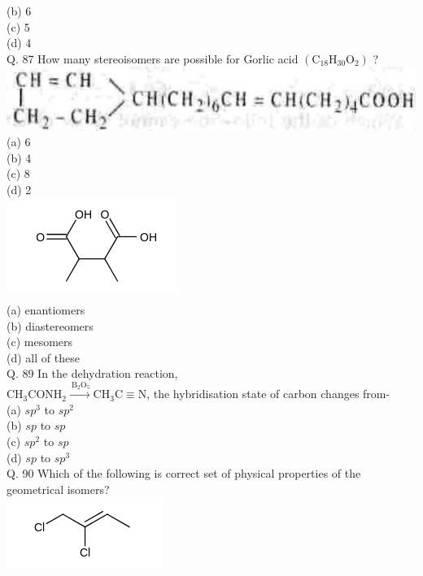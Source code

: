 \documentclass[10pt]{article}
\begin{document}
(b) 6\\
(c) 5\\
(d) 4\\
Q. 87 How many stereoisomers are possible for Gorlic acid $\left(\mathrm{C}_{18} \mathrm{H}_{30} \mathrm{O}_{2}\right)$ ?\\
\includegraphics[max width=\textwidth, center]{2025_01_28_8470952b98110cec3aabg-138}\\
(a) 6\\
(b) 4\\
(c) 8\\
(d) 2\\
\includegraphics{smile-1d13e4876befb70ce0bf0c370d87f4cffd1e5d79}\\
(a) enantiomers\\
(b) diastereomers\\
(c) mesomers\\
(d) all of these\\
Q. 89 In the dehydration reaction,\\
$\mathrm{CH}_{3} \mathrm{CONH}_{2} \xrightarrow{\mathrm{~B}_{2} \mathrm{O}_{5}} \mathrm{CH}_{3} \mathrm{C} \equiv \mathrm{N}$, the hybridisation state of carbon changes from-\\
(a) $s p^{3}$ to $s p^{2}$\\
(b) $s p$ to $s p$\\
(c) $s p^{2}$ to $s p$\\
(d) $s p$ to $s p^{3}$\\
Q. 90 Which of the following is correct set of physical properties of the geometrical isomers?\\
\includegraphics{smile-471a9570b438767738b06e32fcb4f2bf6aa3de5d}
\end{document}
